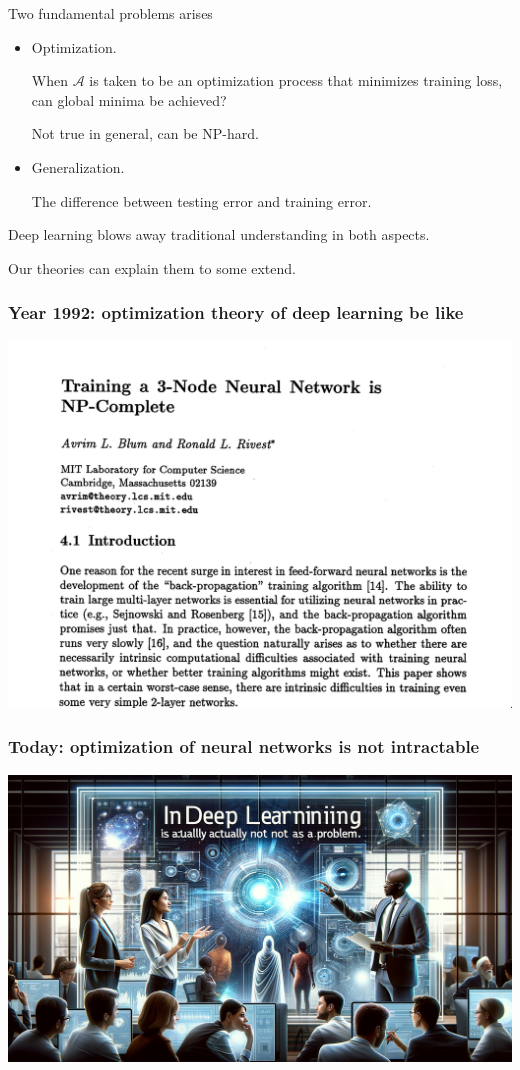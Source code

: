 \documentclass{beamer}   	%
\theoremstyle{definition}
\begin{document}
\begin{frame}
	Two fundamental problems arises
	\begin{itemize}
		\item Optimization.

		When $\mathcal{A}$ is taken to be an optimization process that minimizes training loss, can global minima be achieved?

		Not true in general, can be NP-hard.
		\item Generalization.

		The difference between testing error and training error.
	\end{itemize}

	Deep learning blows away traditional understanding in both aspects.

	Our theories can explain them to some extend.
\end{frame}

\begin{frame}
\frametitle{Year 1992: optimization theory of deep learning be like}
\includegraphics[width=\linewidth]{train_nn_is_np_complete.png}
\end{frame}

\begin{frame}
\frametitle{Today: optimization of neural networks is not intractable}
\includegraphics[width=\linewidth]{nn_is_not_a_problem.png}
\end{frame}
\end{document}
